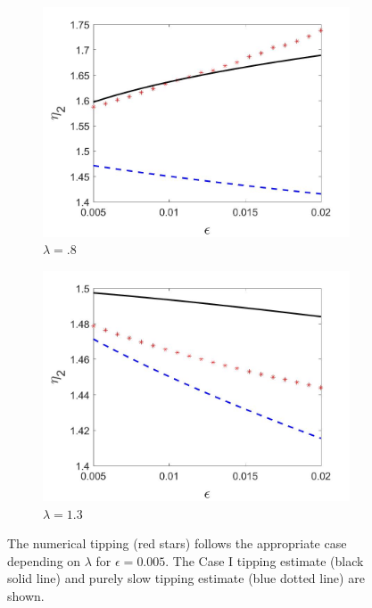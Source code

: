 \begin{figure}[H]
\centering
\begin{subfigure}{.5\textwidth}
  \centering
  \includegraphics[width=\linewidth]{twoD/slowosc_epscomp_mixed.jpg}
  \caption{$\lambda=.8$}
\end{subfigure}%
\begin{subfigure}{.5\textwidth}
  \centering
  \includegraphics[width=\linewidth]{twoD/slowosc_epscomp_slow.jpg}
  \caption{$\lambda=1.3$}
\end{subfigure}
\caption{The numerical tipping (red stars) follows the appropriate case depending on $\lambda$ for $\epsilon=0.005$. The Case I tipping estimate (black solid line) and purely slow tipping estimate (blue dotted line) are shown.}
\label{fig:twoD_slowosc_epscomp}
\end{figure}

